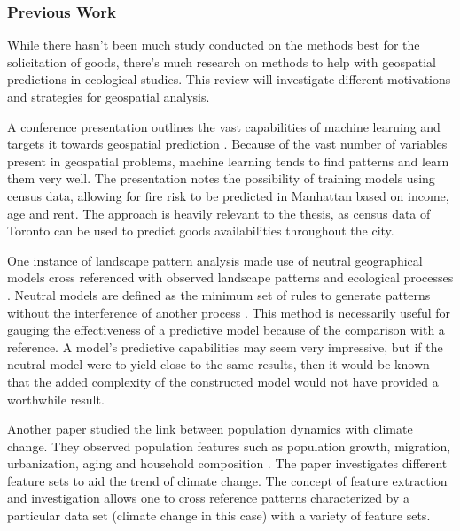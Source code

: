 \documentclass[12pt]{article}
\begin{document}
      
   \subsubsection{Previous Work}
   While there hasn't been much study conducted on the methods best for the solicitation of goods, there's much research on methods to help with geospatial predictions in ecological studies. This review will investigate different motivations and strategies for geospatial analysis. 

   A conference presentation outlines the vast capabilities of machine learning and targets it towards geospatial prediction \cite{confpres}. Because of the vast number of variables present in geospatial problems, machine learning tends to find patterns and learn them very well. The presentation notes the possibility of training models using census data, allowing for fire risk to be predicted in Manhattan based on income, age and rent. The approach is heavily relevant to the thesis, as census data of Toronto can be used to predict goods availabilities throughout the city.

   One instance of landscape pattern analysis made use of neutral geographical models cross referenced with observed landscape patterns and ecological processes \cite{lpa}. Neutral models are defined as the minimum set of rules to generate patterns without the interference of another process \cite{neutralmodel}. This method is necessarily useful for gauging the effectiveness of a predictive model because of the comparison with a reference. A model's predictive capabilities may seem very impressive, but if the neutral model were to yield close to the same results, then it would be known that the added complexity of the constructed model would not have provided a worthwhile result. 

   Another paper studied the link between population dynamics with climate change. They observed population features such as population growth, migration, urbanization, aging and household composition \cite{popdyn}. The paper investigates different feature sets to aid the trend of climate change. The concept of feature extraction and investigation allows one to cross reference patterns characterized by a particular data set (climate change in this case) with a variety of feature sets. 
\end{document}
